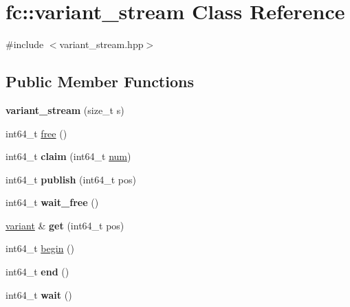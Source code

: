 \hypertarget{classfc_1_1variant__stream}{}\section{fc\+:\+:variant\+\_\+stream Class Reference}
\label{classfc_1_1variant__stream}


{\ttfamily \#include $<$variant\+\_\+stream.\+hpp$>$}

\subsection*{Public Member Functions}
\begin{DoxyCompactItemize}
\item 
\mbox{\label{classfc_1_1variant__stream_addb34b5a7761e521b06adcc909d1e07c}} 
{\bfseries variant\+\_\+stream} (size\+\_\+t s)
\item 
int64\+\_\+t \mbox{\hyperlink{classfc_1_1variant__stream_a27edce830ba6ed70ed293096be85495b}{free}} ()
\item 
\mbox{\label{classfc_1_1variant__stream_a51044a413bcf7e74cdb287947a6871cb}} 
int64\+\_\+t {\bfseries claim} (int64\+\_\+t \mbox{\hyperlink{structnum}{num}})
\item 
\mbox{\label{classfc_1_1variant__stream_a8e590de1bbe36cd4899e1be2a2919244}} 
int64\+\_\+t {\bfseries publish} (int64\+\_\+t pos)
\item 
\mbox{\label{classfc_1_1variant__stream_a0b3239fe3a02325ed1a656242185d957}} 
int64\+\_\+t {\bfseries wait\+\_\+free} ()
\item 
\mbox{\label{classfc_1_1variant__stream_a79d8dd88198609aa353453f0658744c3}} 
\mbox{\hyperlink{classfc_1_1variant}{variant}} \& {\bfseries get} (int64\+\_\+t pos)
\item 
int64\+\_\+t \mbox{\hyperlink{classfc_1_1variant__stream_a8a0ba29c9ff02e5eacbbf7cdc838031a}{begin}} ()
\item 
\mbox{\label{classfc_1_1variant__stream_a8ef5eb832531813e0ef7860da128d458}} 
int64\+\_\+t {\bfseries end} ()
\item 
\mbox{\label{classfc_1_1variant__stream_ab540ce964d2a642c0d193b04d7862e16}} 
int64\+\_\+t {\bfseries wait} ()
\end{DoxyCompactItemize}


